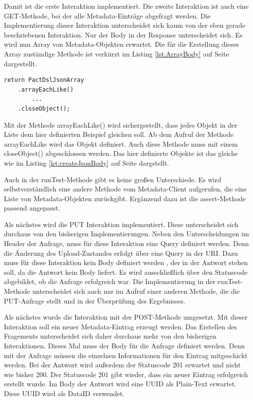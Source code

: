 \documentclass{llncs}
\begin{document}
Damit ist die erste Interaktion implementiert. Die zweite Interaktion ist auch eine GET-Methode, bei der alle Metadata-Einträge abgefragt werden. Die Implementierung dieser Interaktion unterscheidet sich kaum von der eben gerade beschriebenen Interaktion. Nur der Body in der Response unterscheidet sich. Es wird nun Array von Metadata-Objekten erwartet. Die für die Erstellung dieses Array zuständige Methode ist verkürzt im Listing \ref{lst:ArrayBody} auf Seite \pageref{lst:ArrayBody} dargestellt.

\lstset{language = Java}
\begin{lstlisting}[caption=Erstellung eines Array,label={lst:ArrayBody}]
return PactDslJsonArray
    .arrayEachLike()
        ...
    .closeObject();
\end{lstlisting}

Mit der Methode arrayEachLike() wird sichergestellt, dass jedes Objekt in der Liste dem hier definierten Beispiel gleichen soll. Ab dem Aufruf der Methode arrayEachLike wird das Objekt definiert. Auch diese Methode muss mit einem closeObject() abgeschlossen werden. Das hier definierte Objekte ist das gleiche wie im Listing \ref{lst:createJsonBody} auf Seite \pageref{lst:createJsonBody} dargstellt.

Auch in der runTest-Methode gibt es keine großen Unterschiede. Es wird selbstverständlich eine andere Methode vom Metadata-Client aufgerufen, die eine Liste von Metadata-Objekten zurückgibt. Ergänzend dazu ist die assert-Methode passend angepasst.

Als nächstes wird die PUT Interaktion implementiert. Diese unterscheidet sich durchaus von den bisherigen Implementierungen. Neben den Unterscheidungen im Header der Anfrage, muss für diese Interaktion eine Query definiert werden. Denn die Änderung des Upload-Zustandes erfolgt über eine Query in der URI. 
Dazu muss für diese Interaktion kein Body definiert werden , der in der Antwort stehen soll, da die Antwort kein Body liefert. Es wird ausschließlich über den Statuscode abgebildet, ob die Anfrage erfolgreich war.
Die Implementierung in der runTest-Methode unterscheidet sich auch nur im Aufruf einer anderen Methode, die die PUT-Anfrage stellt und in der Überprüfung des Ergebnisses.

Als nächstes wurde die Interaktion mit der POST-Methode umgesetzt. Mit dieser Interaktion soll ein neuer Metadata-Eintrag erzeugt werden. Das Erstellen des Fragements unterscheidet sich daher durchaus mehr von den bisherigen Interaktionen. Dieses Mal muss der Body für die Anfrage definiert werden. Denn mit der Anfrage müssen die einzelnen Informationen für den Eintrag mitgeschickt werden. Bei der Antwort wird außerdem der Statuscode 201 erwartet und nicht wie bisher 200. Der Statuscode 201 gibt wieder, dass ein neuer Eintrag erfolgreich erstellt wurde. Im Body der Antwort wird eine UUID als Plain-Text erwartet. Diese UUID wird als DataID verwendet.
\end{document}
